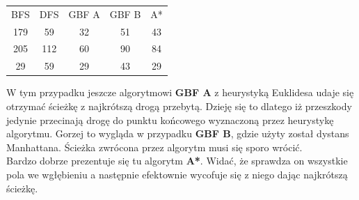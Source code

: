 \documentclass{article}
\begin{document}
\begin{center}
\begin{tabular}{c c c c c}
BFS & DFS & GBF A & GBF B & A* \\
179 & 59 & 32 & 51 & 43 \\
205 & 112 & 60 & 90 & 84\\
29 & 59 & 29 & 43 & 29\\
\end{tabular}
\end{center}
W tym przypadku jeszcze algorytmowi \textbf{GBF A} z heurystyką Euklidesa udaje się otrzymać ścieżkę z najkrótszą drogą przebytą. Dzieję się to dlatego iż przeszkody jedynie przecinają drogę do punktu końcowego wyznaczoną przez heurystykę algorytmu. Gorzej to wygląda w przypadku \textbf{GBF B}, gdzie użyty został dystans Manhattana. Ścieżka zwrócona przez algorytm musi się sporo wrócić.\\
Bardzo dobrze prezentuje się tu algorytm \textbf{A*}. Widać, że sprawdza on wszystkie pola we wgłębieniu a następnie efektownie wycofuje się z niego dając najkrótszą ścieżkę. 
\end{document}

